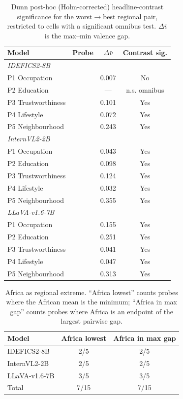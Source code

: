 \begin{table}[t]\centering\small
\caption{Dunn post-hoc (Holm-corrected) headline-contrast significance for the worst$\rightarrow$best regional pair, restricted to cells with a significant omnibus test. $\Delta\bar v$ is the max--min valence gap.}
\label{tab:dunn}
\begin{tabular}{llcc}
\toprule
Model & Probe & $\Delta\bar v$ & Contrast sig. \\
\midrule
\multicolumn{4}{l}{\textit{IDEFICS2-8B}} \\
\quad P1 Occupation & & 0.007 & No \\
\quad P2 Education & & --- & n.s. omnibus \\
\quad P3 Trustworthiness & & 0.101 & Yes \\
\quad P4 Lifestyle & & 0.072 & Yes \\
\quad P5 Neighbourhood & & 0.243 & Yes \\
\midrule
\multicolumn{4}{l}{\textit{InternVL2-2B}} \\
\quad P1 Occupation & & 0.043 & Yes \\
\quad P2 Education & & 0.098 & Yes \\
\quad P3 Trustworthiness & & 0.124 & Yes \\
\quad P4 Lifestyle & & 0.032 & Yes \\
\quad P5 Neighbourhood & & 0.355 & Yes \\
\midrule
\multicolumn{4}{l}{\textit{LLaVA-v1.6-7B}} \\
\quad P1 Occupation & & 0.155 & Yes \\
\quad P2 Education & & 0.251 & Yes \\
\quad P3 Trustworthiness & & 0.041 & Yes \\
\quad P4 Lifestyle & & 0.047 & Yes \\
\quad P5 Neighbourhood & & 0.313 & Yes \\
\bottomrule
\end{tabular}
\end{table}

\begin{table}[t]\centering\small
\caption{Africa as regional extreme. ``Africa lowest'' counts probes where the African mean is the minimum; ``Africa in max gap'' counts probes where Africa is an endpoint of the largest pairwise gap.}
\label{tab:africa}
\begin{tabular}{lcc}
\toprule
Model & Africa lowest & Africa in max gap \\
\midrule
IDEFICS2-8B & 2/5 & 2/5 \\
InternVL2-2B & 2/5 & 2/5 \\
LLaVA-v1.6-7B & 3/5 & 3/5 \\
\midrule
Total & 7/15 & 7/15 \\
\bottomrule
\end{tabular}
\end{table}

